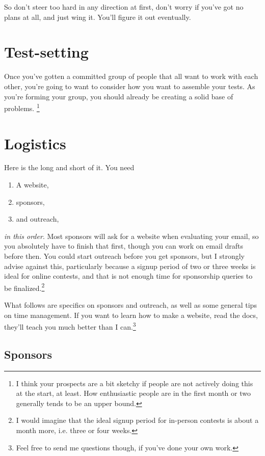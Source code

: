 \documentclass[points=false]{bounce}
\begin{document}
So don't steer too hard in any direction at first,
don't worry if you've got no plans at all,
and just wing it. You'll figure it out eventually.

\section{Test-setting}

Once you've gotten a committed group of people that all want to work with each other,
you're going to want to consider how you want to assemble your tests.
As you're forming your group, you should already be creating a solid base of problems.
\footnote{I think your prospects are a bit sketchy
if people are not actively doing this at the start, at least.
How enthusiastic people are in the first month or two
generally tends to be an upper bound.}

\section{Logistics}

Here is the long and short of it. You need
\begin{enumerate}
    \item A website,
    \item sponsors,
    \item and outreach,
\end{enumerate}
\emph{in this order}. Most sponsors will ask for a website when evaluating your email, so you absolutely have to finish that first, though you can work on email drafts before then. You could start outreach before you get sponsors, but I strongly advise against this, particularly because a signup period of two or three weeks is ideal for online contests, and that is not enough time for sponsorship queries to be finalized.\footnote{I would imagine that the ideal signup period for in-person contests is about a month more, i.e. three or four weeks.}

What follows are specifics on sponsors and outreach, as well as some general tips on time management. If you want to learn how to make a website, read the docs, they'll teach you much better than I can.\footnote{Feel free to send me questions though, if you've done your own work.}

\subsection{Sponsors}
\end{document}
